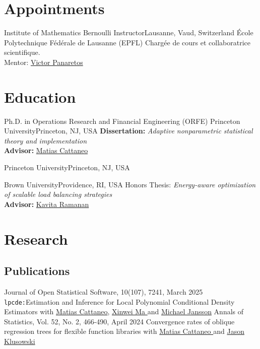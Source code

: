 \documentclass[10pt,a4paper,roman]{moderncv}        %
\begin{document}
\makecvtitle

\vspace{-1cm}
\section{Appointments}
{Institute of Mathematics}
{Bernoulli Instructor}{Lausanne, Vaud, Switzerland}
{École Polytechnique Fédérale de Lausanne (EPFL)}
{Charg\'ee de cours et collaboratrice scientifique.\\
  Mentor: \color{blue}\href{https://people.epfl.ch/victor.panaretos}{Victor Panaretos}}
\vspace{-0.3cm}
\section{Education}
{Ph.D. in Operations Research and Financial Engineering (ORFE)}
{Princeton University}{Princeton, NJ, USA}{}
{\textbf{Dissertation:} \textit{Adaptive nonparametric statistical theory and implementation}
  \\
  \textbf{Advisor: }\color{blue}\href{https://cattaneo.princeton.edu}{Matias Cattaneo}\color{black}}

{Princeton University}{Princeton, NJ, USA}{}{}

{Brown University}{Providence, RI, USA}{}{ Honors Thesis: \textit{Energy-aware optimization of scalable load balancing
    strategies}
  \\
  \textbf{Advisor:}
  \color{blue}\href{https://www.brown.edu/academics/applied-mathematics/faculty/kavita-ramanan/home}
  {Kavita Ramanan}\color{black}}  %

\vspace{-0.3cm}
\section{Research}
\subsection{Publications}
\cventry{}
{Journal of Open Statistical Software, 10(107), 7241, March 2025}
{\texttt{lpcde:}Estimation and Inference for Local Polynomial Conditional Density Estimators}
{}
{}
{with \color{blue}\href{https://cattaneo.princeton.edu}{Matias Cattaneo}\color{black},
  \color{blue}\href{https://sites.google.com/view/xinweima/home?authuser=0}{Xinwei
    Ma }\color{black}
  and
  \color{blue}\href{https://sites.google.com/berkeley.edu/michael-jansson/}{Michael
    Jansson}\color{black}
}
\cventry{}
{Annals of Statistics, Vol. 52, No. 2, 466-490, April 2024}
{Convergence rates of oblique regression trees for flexible function libraries}
{}
{}
{with
  \color{blue}\href{https://cattaneo.princeton.edu}{Matias Cattaneo }\color{black} and
  \color{blue}\href{https://klusowski.princeton.edu}{Jason Klusowski}}
\end{document}
